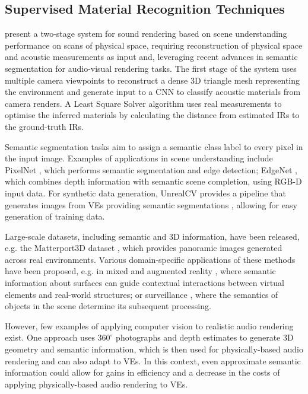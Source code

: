 \subsection{Supervised Material Recognition Techniques}
\cite{schissler2017acoustic} present a two-stage system for sound rendering based on scene understanding performance on scans of physical space, requiring reconstruction of physical space and acoustic measurements as input and, leveraging recent advances in semantic segmentation for audio-visual rendering tasks. The first stage of the system uses multiple camera viewpoints to reconstruct a dense 3D triangle mesh representing the environment and generate input to a CNN to classify acoustic materials from camera renders. A Least Square Solver algorithm uses real measurements to optimise the inferred materials by calculating the distance from estimated IRs to the ground-truth IRs.\par
Semantic segmentation tasks aim to assign a semantic class label to every pixel in the input image. Examples of applications in scene understanding include PixelNet \citep{bansal2016pixelnet}, which performs semantic segmentation and edge detection; EdgeNet \citep{dourado2019edgenet}, which combines depth information with semantic scene completion, using RGB-D input data. For synthetic data generation, UnrealCV provides a pipeline that generates images from VEs providing semantic segmentations \citep{qiu2016unrealcv}, allowing for easy generation of training data.\par
Large-scale datasets, including semantic and 3D information, have been released, e.g. the Matterport3D dataset \citep{chang2017matterport3d}, which provides panoramic images generated across real environments. Various domain-specific applications of these methods have been proposed, e.g. in mixed and augmented reality \citep{chen2018context}, where semantic information about surfaces can guide contextual interactions between virtual elements and real-world structures; or surveillance \cite{mao2018aic2018}, where the semantics of objects in the scene determine its subsequent processing.\par
However, few examples of applying computer vision to realistic audio rendering exist. One approach \cite{kim2019immersive} uses $360^{\circ}$ photographs and depth estimates to generate 3D geometry and semantic information, which is then used for physically-based audio rendering and can also adapt to VEs. In this context, even approximate semantic information could allow for gains in efficiency and a decrease in the costs of applying physically-based audio rendering to VEs.\par
